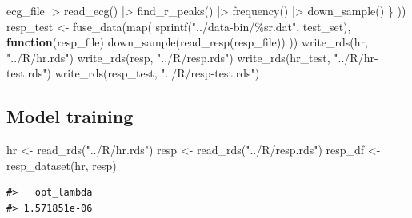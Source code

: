 \documentclass[
]{article}
\newenvironment{Shaded}{\begin{snugshade}}{\end{snugshade}}
\newcommand{\ControlFlowTok}[1]{\textcolor[rgb]{0.13,0.29,0.53}{\textbf{#1}}}
\newcommand{\FunctionTok}[1]{\textcolor[rgb]{0.00,0.00,0.00}{#1}}
\newcommand{\NormalTok}[1]{#1}
\newcommand{\OtherTok}[1]{\textcolor[rgb]{0.56,0.35,0.01}{#1}}
\newcommand{\SpecialCharTok}[1]{\textcolor[rgb]{0.00,0.00,0.00}{#1}}
\newcommand{\StringTok}[1]{\textcolor[rgb]{0.31,0.60,0.02}{#1}}
\begin{document}
\begin{Shaded}
\begin{Highlighting}[]
\NormalTok{    ecg\_file }\SpecialCharTok{|\textgreater{}}
      \FunctionTok{read\_ecg}\NormalTok{() }\SpecialCharTok{|\textgreater{}}
      \FunctionTok{find\_r\_peaks}\NormalTok{() }\SpecialCharTok{|\textgreater{}}
      \FunctionTok{frequency}\NormalTok{() }\SpecialCharTok{|\textgreater{}}
      \FunctionTok{down\_sample}\NormalTok{()}
\NormalTok{  \}}
\NormalTok{))}
\NormalTok{resp\_test }\OtherTok{\textless{}{-}} \FunctionTok{fuse\_data}\NormalTok{(}\FunctionTok{map}\NormalTok{(}
  \FunctionTok{sprintf}\NormalTok{(}\StringTok{"../data{-}bin/\%sr.dat"}\NormalTok{, test\_set),}
  \ControlFlowTok{function}\NormalTok{(resp\_file) }\FunctionTok{down\_sample}\NormalTok{(}\FunctionTok{read\_resp}\NormalTok{(resp\_file))}
\NormalTok{))}
\FunctionTok{write\_rds}\NormalTok{(hr, }\StringTok{"../R/hr.rds"}\NormalTok{)}
\FunctionTok{write\_rds}\NormalTok{(resp, }\StringTok{"../R/resp.rds"}\NormalTok{)}
\FunctionTok{write\_rds}\NormalTok{(hr\_test, }\StringTok{"../R/hr{-}test.rds"}\NormalTok{)}
\FunctionTok{write\_rds}\NormalTok{(resp\_test, }\StringTok{"../R/resp{-}test.rds"}\NormalTok{)}
\end{Highlighting}
\end{Shaded}

\hypertarget{model-training-1}{%
\subsection{Model training}\label{model-training-1}}

\begin{Shaded}
\begin{Highlighting}[]
\NormalTok{hr }\OtherTok{\textless{}{-}} \FunctionTok{read\_rds}\NormalTok{(}\StringTok{"../R/hr.rds"}\NormalTok{)}
\NormalTok{resp }\OtherTok{\textless{}{-}} \FunctionTok{read\_rds}\NormalTok{(}\StringTok{"../R/resp.rds"}\NormalTok{)}
\NormalTok{resp\_df }\OtherTok{\textless{}{-}} \FunctionTok{resp\_dataset}\NormalTok{(hr, resp)}
\end{Highlighting}
\end{Shaded}

\begin{Shaded}
\end{Shaded}

\begin{verbatim}
#>   opt_lambda 
#> 1.571851e-06
\end{verbatim}
\end{document}
